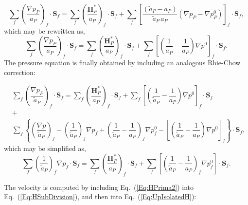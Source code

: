 \documentclass[final,3p,times,11pt,onecolumn]{myElsarticle}
\numberwithin{equation}{section}
\begin{document}
\begin{equation}
\label{Eq:pressureReplacedSimplec}
\sum_{f} 
\left(
\dfrac
{
\nabla p_P}
{a_P}
\right)_f
\cdotp 
\boldsymbol{S}_{f}
=
\sum_{f} 
\left(
\dfrac
{
\boldsymbol{H}_P^{*}
}
{a_P}
\right)_f
\cdotp 
\boldsymbol{S}_{f}
+
\sum_f
\left[
\dfrac
{
\left(
\tilde{a}_P
-
a_P
\right)
}
{
\tilde{a}_P\,a_P
}
\left(
\nabla p_P
-
\nabla p_P^{0}
\right)
\right]_f
\cdot
\boldsymbol{S}_{f},
\end{equation}
which may be rewritten as,
\begin{equation}
\label{Eq:pressureReplacedSimplec2}
\sum_{f} 
\left(
\dfrac
{
\nabla p_P}
{\tilde{a}_P}
\right)_f
\cdotp 
\boldsymbol{S}_{f}
=
\sum_{f} 
\left(
\dfrac
{
\boldsymbol{H}_P^{*}
}
{a_P}
\right)_f
\cdotp 
\boldsymbol{S}_{f}
+
\sum_f
\left[
\left(
\dfrac{1}
{\tilde{a}_P}
-
\dfrac{1}
{a_P}
\right)
\nabla p^{0}
\right]_f
\cdot
\boldsymbol{S}_f.
\end{equation}
The pressure equation is finally obtained by including an analogous Rhie-Chow correction:

\begin{equation}
\label{eq:pEqnSIMPLEC2}
\begin{array}{ccc}
&
\displaystyle 
\sum_{f} 
\left(
\dfrac
{
\nabla p_P}
{\tilde{a}_P}
\right)_f
\cdotp 
\boldsymbol{S}_{f} 
=
\sum_{f} 
\left(
\dfrac
{
\boldsymbol{H}_P^{*}
}
{a_P}
\right)_f
\cdotp 
\boldsymbol{S}_{f}
+
\sum_f
\left[
\left(
\dfrac{1}
{\tilde{a}_P}
-
\dfrac{1}
{a_P}
\right)
\nabla p^{0}
\right]_f
\cdot
\boldsymbol{S}_f
&
\\
&+& \\
&
\displaystyle 
\sum_f
\left\lbrace
\left(
\dfrac
{
\nabla p
}
{\tilde{a}_P}
\right)_f
-
\left(
\dfrac
{1}
{\tilde{a}_P}
\right)_f
\nabla p_f
+
\left(
\dfrac
{1}
{\tilde{a}_P}
-
\dfrac
{1}
{a_P}
\right)_f
\nabla p^{0}_f
-
\left[
\left(
\dfrac
{1}
{\tilde{a}_P}
-
\dfrac
{1}
{a_P}
\right)
\nabla p^0
\right]_f
\right\rbrace
\cdot
\boldsymbol{S}_f,
&
\end{array}
\end{equation}
which may be simplified as,
\begin{equation}
\sum_f
\left(
\dfrac
{1}
{\tilde{a}_P}
\right)_f
\nabla p_f
\cdot 
\boldsymbol{S}_f
= 
\sum_f 
\left(
\frac{
\boldsymbol{H}_P^*
}{a_P}
\right)_f 
\cdot
\boldsymbol{S}_f
+
\sum_f
\left[
\left(
\dfrac
{1}
{\tilde{a}_P}
-
\dfrac
{1}
{a_P}
\right)_f
\nabla p^{0}_f
\right]
\cdot
\boldsymbol{S}_f.
\label{eq:pEqnSIMPLEC}
\end{equation}

The velocity is computed by including Eq.~(\ref{Eq:HPrima2}) into Eq.~(\ref{Eq:HSubDivision}), and then into Eq.~(\ref{Eq:UpIsolatedH}):
\end{document}
